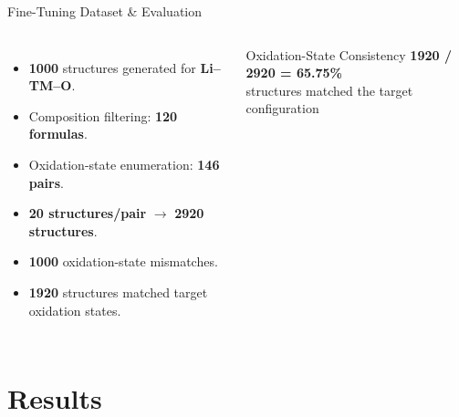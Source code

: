 \documentclass[aspectratio=169, 11pt]{beamer}
\begin{document}
\begin{frame}{Fine-Tuning Dataset \& Evaluation}
\begin{columns}[T]
{\footnotesize
\begin{itemize}
    \setlength{\itemsep}{2pt}

    \item \textbf{1000} structures generated for \textbf{Li--TM--O}.

    \item Composition filtering: \textbf{120 formulas}.

    \item Oxidation-state enumeration\cite{pymatgen2013}: \textbf{146 pairs}.

    \item \textbf{20 structures/pair} $\rightarrow$ \textbf{2920 structures}.

    \item \textbf{1000} oxidation-state mismatches.

    \item \textbf{1920} structures matched target oxidation states.

\end{itemize}
}

\vspace{0.04cm}

\begin{block}{\footnotesize Oxidation-State Consistency}
    \centering
    \normalsize
    \textbf{1920 / 2920 = 65.75\%}\\[1pt]
    \footnotesize
    structures matched the target configuration
\end{block}

\end{columns}



\end{frame}

\section{Results}
\end{document}
